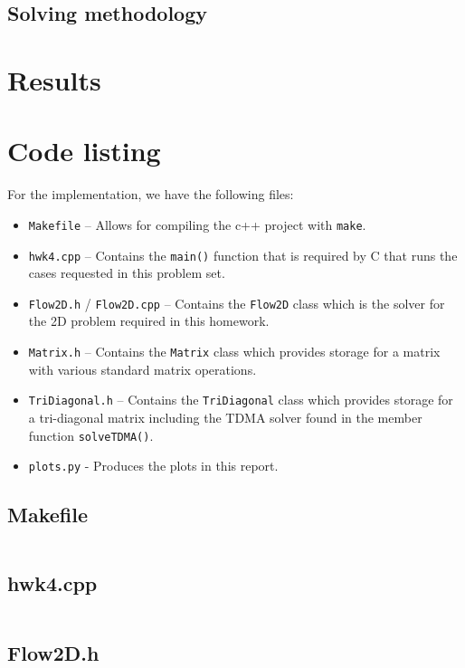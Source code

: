 \documentclass{article}
\begin{document}
\subsection*{Solving methodology}

\section*{Results}

\section*{Code listing}

For the implementation, we have the following files:
\begin{itemize}
	\item \texttt{Makefile} -- Allows for compiling the c++ project with \texttt{make}.
	\item \texttt{hwk4.cpp} -- Contains the \texttt{main()} function that is required by C that runs the cases requested in this problem set.
	\item \texttt{Flow2D.h} / \texttt{Flow2D.cpp} -- Contains the \texttt{Flow2D} class which is the solver for the 2D problem required in this homework.
	\item \texttt{Matrix.h} -- Contains the \texttt{Matrix} class which provides storage for a matrix with various standard matrix operations.
	\item \texttt{TriDiagonal.h} -- Contains the \texttt{TriDiagonal} class which provides storage for a tri-diagonal matrix including the TDMA solver found in the member function \texttt{solveTDMA()}.
	\item \texttt{plots.py} - Produces the plots in this report.
\end{itemize}

\subsection*{Makefile}
\inputminted[fontsize=\footnotesize]{Makefile}{../Makefile}

\subsection*{hwk4.cpp}
\inputminted[fontsize=\footnotesize]{c++}{../hwk4.cpp}

\subsection*{Flow2D.h}
\inputminted[fontsize=\footnotesize]{c++}{../Flow2D.h}
\end{document}
